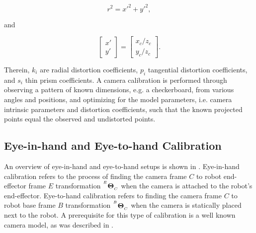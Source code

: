 \begin{equation}
    r^2 = x'^2 + y'^2,
\end{equation}

and

\begin{equation}
    \begin{bmatrix}
        x' \\
        y'
    \end{bmatrix} = \begin{bmatrix}
        x_c/z_c \\
        y_c/z_c
    \end{bmatrix}.
\end{equation}

Therein, $k_i$ are radial distortion coefficients, $p_i$ tangential distortion coefficients, and $s_i$ thin prism coefficients. A camera calibration is performed through observing a pattern of known dimensions, e.g. a checkerboard, from various angles and positions, and optimizing for the model parameters, i.e. camera intrinsic parameters and distortion coefficients, such that the known projected points equal the observed and undistorted points.

\subsection{Eye-in-hand and Eye-to-hand Calibration}
\label{in:sec:eye_in_to_hand_calibration}
An overview of eye-in-hand and eye-to-hand setups is shown in . Eye-in-hand calibration refers to the process of finding the camera frame $C$ to robot end-effector frame $E$ transformation ${}^{^E}\mathbf{\Theta}_{_C}$ when the camera is attached to the robot's end-effector. Eye-to-hand calibration refers to finding the camera frame $C$ to robot base frame $B$ transformation ${}^{^B}\mathbf{\Theta}_{_C}$ when the camera is statically placed next to the robot. A prerequisite for this type of calibration is a well known camera model, as was described in .

